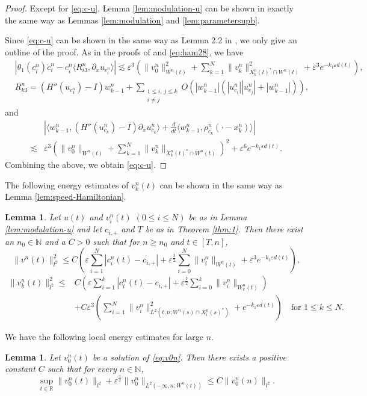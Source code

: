 \documentclass[11pt]{amsart}
\newtheorem{lemma}[theorem]{Lemma}
\theoremstyle{remark}
\numberwithin{equation}{section}
\begin{document}
\begin{proof}
Except for \eqref{eq:c-u}, Lemma \ref{lem:modulation-u} can be shown in exactly
the same way as Lemmas \ref{lem:modulation} and \ref{lem:parametersupb}.
\par
Since \eqref{eq:c-u} can be shown in the same way as Lemma 2.2 in \cite{Mi2},
we only give an outline of the proof.
As in the proofs of \cite[Lemmas 2.2 and 2.5]{Mi2} and  \eqref{eq:ham28},
 we have
\begin{align*}
& \left|\theta_1(c_i^n)\dot{c}_i^n-c_i^n{\langle} R_{i3}^n,{\partial}_xu_{c_i^n}{\rangle}\right|
\lesssim 
{\varepsilon}^3\left(\|v_0^n\|_{W^n(t)}^2+\sum_{k=1}^N\|v_k^n\|_{X_k^n(t)^*\cap W^n(t)}^2
+{\varepsilon}^3e^{-k_1{\varepsilon} d(t)}\right),\\
& R_{k3}^n= (H''(u_{c_k^n})-I)w_{k-1}^n+\sum_{\substack{1\le i,\,j\le k\\ i\ne j}}
O(|w_{k-1}^n|(|u_{c_i}^n||u_{c_j}^n|+|w_{k-1}^n|)),
\end{align*}
and
\begin{align*}
& \left| {\langle} w_{k-1}^n,(H''(u_{c_k}^n)-I){\partial}_xu_{c_k}^n{\rangle}
+\frac{d}{dt}{\langle} w_{k-1}^n,\rho_{c_k}^n(\cdot-x_k^n){\rangle}\right|
\\ \lesssim &
{\varepsilon}^3
\left(\|v_0^n\|_{W^n(t)}+\sum_{k=1}^N\|v_k^n\|_{X_k^n(t)^*\cap W^n(t)}\right)^2
+{\varepsilon}^6e^{-k_1{\varepsilon} d(t)}.
\end{align*}
Combining the above, we obtain \eqref{eq:c-u}.
\end{proof}

The following energy estimates of $v_k^n(t)$ can be shown in the 
same way as  Lemma \ref{lem:speed-Hamiltonian}.
\begin{lemma}
  \label{lem:sp-Ham-u}
Let $u(t)$ and $v_i^n(t)$ $(0\le i\le N)$ be as in Lemma \ref{lem:modulation-u}
and let $c_{i,+}$ and $T$ be as in Theorem \ref{thm:1}.
Then there exist an $n_0\in {\mathbb{N}}$ and a $C>0$ such that for $n\ge n_0$
and $t\in[T,n]$,
$$\|v^n(t)\|_{l^2}^2\le C\left({\varepsilon}\sum_{i=1}^N|c_i^n(t)-c_{i,+}|+
{\varepsilon}^{\frac32}\sum_{i=0}^N \|v_i^n\|_{W^n(t)}+{\varepsilon}^3e^{-k_1{\varepsilon} d(t)}\right),$$
\begin{align*}
\|v_k^n(t)\|_{l^2}^2 \le & C\left({\varepsilon}\sum_{i=1}^k|c_i^n(t)-c_{i,+}|
+{\varepsilon}^{\frac32}\sum_{i=0}^k\|v_i^n\|_{W_k^n(t)}\right)
\\ & +C{\varepsilon}^3\left(\sum_{i=1}^N\|v_i^n\|_{L^2(t,n;W^n(s)\cap X_i^n(s)^*)}^2
+e^{-k_1{\varepsilon} d(t)}\right)\quad\text{for $1\le k\le N$.}
\end{align*}
\end{lemma}
We have the following local energy estimates for large $n$.
\begin{lemma}
  \label{lem:virial-0u}
Let $v_0^n(t)$ be a solution of \eqref{eq:v0n}. Then there exists a positive
constant $C$ such that for every $n\in{\mathbb{N}}$,
\begin{equation*}
\sup_{t\in{\mathbb{R}}}\|v_0^n(t)\|_{l^2}+{\varepsilon}^{\frac32}\|v_0^n\|_{L^2(-\infty,n;W^n(t))}
\le C\|v_0^n(n)\|_{l^2}.
\end{equation*}
\end{lemma}
\end{document}
